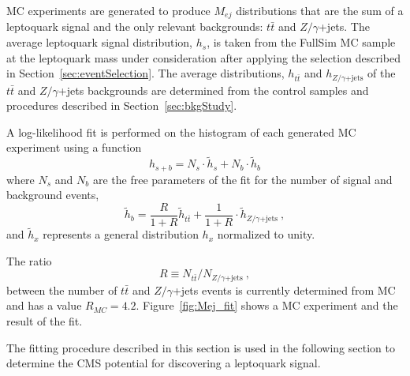 \documentclass{cmspaper}
\begin{document}
\begin{linenumbers}
MC experiments are generated to produce $M_{ej}$ distributions that are the sum
of a leptoquark signal and the only relevant backgrounds: $t\bar{t}$ and $Z/\gamma$+jets.
The average leptoquark signal distribution, $h_s$, is taken from the FullSim MC 
sample at the leptoquark mass under consideration after applying the selection
described in Section~\ref{sec:eventSelection}.
The average distributions, $h_{t\bar{t}}$ and $h_{Z/\gamma\mathrm{+jets}}$ 
of the $t\bar{t}$ and $Z/\gamma$+jets backgrounds are determined from the control samples
and procedures described in Section~\ref{sec:bkgStudy}.

A log-likelihood fit is performed on the histogram of each generated MC experiment
using a function
\begin{displaymath}
  h_{s+b} = N_s \cdot \tilde{h}_s + N_b \cdot \tilde{h}_b
\end{displaymath}
where $N_s$ and $N_b$ are the free parameters of the fit for the number of signal and background events,
\begin{displaymath}
  \tilde{h}_b = \frac{R}{1+R} \tilde{h}_{t\bar{t}} + \frac{1}{1+R} \cdot \tilde{h}_{Z/\gamma\mathrm{+jets}}~\mathrm{,}
\end{displaymath}
and $\tilde{h}_x$ represents a general distribution $h_x$ normalized to unity. 

The ratio
\begin{displaymath}
  R \equiv N_{t\bar{t}} / N_{Z/\gamma\mathrm{+jets}}~\mathrm{,}
\end{displaymath}
between the number of $t\bar{t}$ and $Z/\gamma$+jets events is currently determined from 
MC and has a value $R_{MC}=4.2$.
Figure~\ref{fig:Mej_fit} shows a MC experiment and the result of the fit.

The fitting procedure described in this section is used in the following section
to determine the CMS potential for discovering a leptoquark signal. 



\end{linenumbers}
\end{document}
